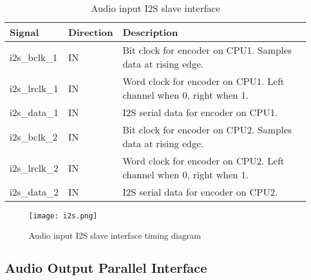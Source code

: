 \documentclass{rep}
\theoremstyle{plain}
\begin{document}
\begin{table}[H]
  \begin{center}
    \begin{tabular}{|l|l|l|}
      \hline
      \rowcolor{iob-green}
      \textbf{Signal} & \textbf{Direction} & \textbf{Description} \\
      \hline
      \hline

      i2s\_bclk\_1 & IN & Bit clock for encoder on CPU1. Samples data at rising edge.\\
      \hline

      \rowcolor{iob-blue}
      i2s\_lrclk\_1 & IN & Word clock for encoder on CPU1. Left channel when 0, right when 1.\\
      \hline

      i2s\_data\_1 & IN & I2S serial data for encoder on CPU1.\\
      \hline
      \hline

      i2s\_bclk\_2 & IN & Bit clock for encoder on CPU2. Samples data at rising edge.\\
      \hline

      \rowcolor{iob-blue}
      i2s\_lrclk\_2 & IN & Word clock for encoder on CPU2. Left channel when 0, right when 1.\\
      \hline

      i2s\_data\_2 & IN & I2S serial data for encoder on CPU2.\\
      \hline

    \end{tabular}
    \caption{Audio input I2S slave interface}
    \label{tab:i2s}
  \end{center}
\end{table}

\begin{figure}[H]
  \begin{center}
    \texttt{[image: i2s.png]}
    \caption{Audio input I2S slave interface timing diagram}
    \label{fig:i2s}
  \end{center}
\end{figure}
\clearpage


\subsection{Audio Output Parallel Interface}
\end{document}
